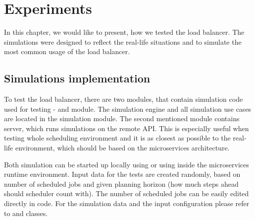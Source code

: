 \chapter{Experiments}\label{ch:experiments}

In this chapter, 
we would like to present,
how we tested the load balancer.
The simulations were designed to reflect the real-life situations 
and to simulate the most common usage of the load balancer.


\section{Simulations implementation}\label{sec:simulations-implementations}
To test the load balancer,
there are two modules, 
that contain simulation code used for testing -
 and  module.
The simulation engine and all simulation use cases are located in the simulation module.
The second mentioned module contains server, 
which runs simulations on the remote API. 
This is especially useful when testing whole scheduling environment
and it is as closest as possible to the real-life environment,
which should be based on the microservices architecture.

Both simulation can be started up locally using  or
using  inside the microservices runtime environment.
Input data for the tests are created randomly,
based on number of scheduled jobs and given planning horizon (how much steps ahead should scheduler count with).
The number of scheduled jobs can be easily edited directly in code.
For the simulation data and the input configuration please refer to  
and  classes.



